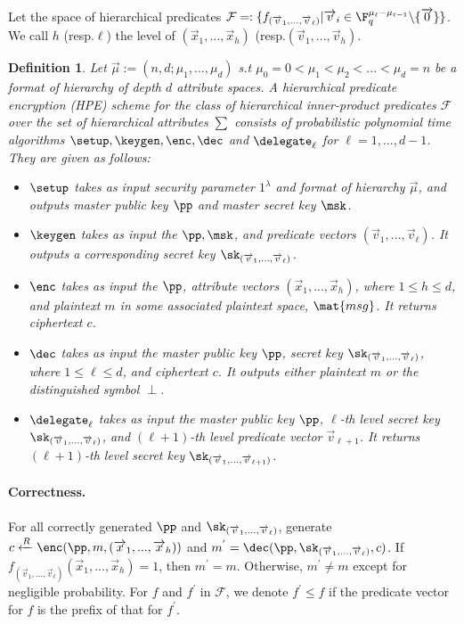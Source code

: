 \documentclass[11pt,hidelinks]{article}
\newtheorem{definition}[theorem]{Definition}
\begin{document}
\begin{appendix}
Let the space of hierarchical predicates $\mathcal{F}=:\{f_{(\overrightarrow{v}_{1},...,\overrightarrow{v}_{\ell})}|\overrightarrow{v}_{i} \in \F^{\mu_{\ell}-\mu_{\ell-1}}_{q}\backslash \{\overrightarrow{0}\}\}$. We call $h$ (resp.$\ell$) the level of $(\overrightarrow{x}_{1},...,\overrightarrow{x}_{h})$ (resp.$(\overrightarrow{v}_{1},...,\overrightarrow{v}_{h})$.
\begin{definition}
Let $\overrightarrow{\mu}:=(n,d;\mu_{1},...,\mu_{d})$ s.t $\mu_{0}=0<\mu_{1}<\mu_{2}<...<\mu_{d}=n$ be a format of hierarchy of depth $d$ attribute spaces. A hierarchical predicate encryption (HPE) scheme for the class of hierarchical inner-product predicates $\mathcal{F}$ over the set of hierarchical attributes $\sum$ consists of probabilistic polynomial time algorithms $\setup, \keygen, \enc, \dec$ and $\delegate_{\ell}$ for $\ell=1,...,d-1$. They are given as follows:
\begin{itemize}
\item $\setup$ takes as input security parameter $1^{\lambda}$ and format of hierarchy $\overrightarrow{\mu}$, and outputs master public key $\pp$ and master secret key $\msk$.
\item $\keygen$ takes as input the $\pp, \msk$, and predicate vectors $(\overrightarrow{v}_{1},...,\overrightarrow{v}_{\ell})$. It outputs a corresponding secret key $\sk_{(\overrightarrow{v}_{1},...,\overrightarrow{v}_{\ell})}$.
\item $\enc$ takes as input the $\pp$, attribute vectors $(\overrightarrow{x}_{1},...,\overrightarrow{x}_{h})$, where $1\leq h \leq d$, and plaintext $m$ in some associated plaintext space, $\mat{msg}$. It returns ciphertext $c$.
\item $\dec$ takes as input the master public key $\pp$, secret key $\sk_{(\overrightarrow{v}_{1},...,\overrightarrow{v}_{\ell})}$, where $1\leq \ell \leq d$, and ciphertext $c$. It outputs either plaintext $m$ or the distinguished symbol $\perp$.
\item $\delegate_{\ell}$ takes as input the master public key $\pp$, $\ell$-th level secret key $\sk_{(\overrightarrow{v}_{1},...,\overrightarrow{v}_{\ell})}$, and $(\ell+1)$-th level predicate vector $\overrightarrow{v}_{\ell+1}$. It returns $(\ell+1)$-th level secret key $\sk_{(\overrightarrow{v}_{1},...,\overrightarrow{v}_{\ell+1})}$.
\end{itemize}
\end{definition}
\paragraph{Correctness.} For all correctly generated $\pp$ and $\sk_{(\overrightarrow{v}_{1},...,\overrightarrow{v}_{\ell})}$, generate $c \xleftarrow{R} \enc(\pp, m, (\overrightarrow{x}_{1},...,\overrightarrow{x}_{h}))$ and $m^{'}= \dec(\pp, \sk_{(\overrightarrow{v}_{1},...,\overrightarrow{v}_{\ell})}, c)$. If $f_{(\overrightarrow{v}_{1},...,\overrightarrow{v}_{\ell})}(\overrightarrow{x}_{1},...,\overrightarrow{x}_{h})=1$, then $m^{'}=m$. Otherwise, $m^{'}\neq m$ except for negligible probability. For $f$ and $f^{'}$ in $\mathcal{F}$, we denote $f^{'}\leq f$ if the predicate vector for $f$ is the prefix of that for $f^{'}$.


\end{appendix}
\end{document}
